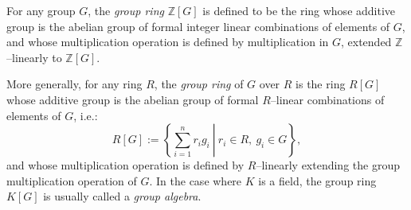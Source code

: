 \documentclass{article}
\begin{document}
For any group $G$, the {\em group ring} $\mathbb{Z}[G]$ is defined to be the ring whose additive group is the abelian group of formal integer linear combinations of elements of $G$, and whose multiplication operation is defined by multiplication in $G$, extended $\mathbb{Z}$--linearly to $\mathbb{Z}[G]$.

More generally, for any ring $R$, the {\em group ring} of $G$ over $R$ is the ring $R[G]$ whose additive group is the abelian group of formal $R$--linear combinations of elements of $G$, i.e.:
$$
R[G] := \left\{\left. \sum_{i=1}^n r_i g_i\ \right|\ r_i \in R,\ g_i \in G\right\},
$$
and whose multiplication operation is defined by $R$--linearly extending the group multiplication operation of $G$. In the case where $K$ is a field, the group ring $K[G]$ is usually called a {\em group algebra}.
\end{document}
